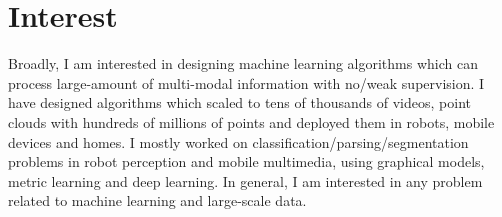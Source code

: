  \section{\mysidestyle \textcolor{olgray}{Interest}}
Broadly, I am interested in designing machine learning algorithms which can process large-amount of multi-modal information with no/weak supervision.  I have designed algorithms which scaled to tens of thousands of videos, point clouds with hundreds of millions of points and deployed them in robots, mobile devices and homes. I mostly worked on classification/parsing/segmentation problems in robot perception and mobile multimedia, using graphical models, metric learning and deep learning. In general, I am interested in any problem related to machine learning and large-scale data.